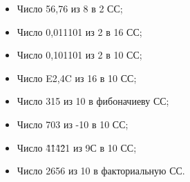 \documentclass[14pt,final,oneside]{extreport}%
\begin{document}
\begin{enumerate}
\begin{itemize}
            \item Число 56,76 из 8 в 2 СС;
            \item Число 0,011101 из 2 в 16 СС;
            \item Число 0,101101 из 2 в 10 СС;
            \item Число E2,4C из 16 в 10 СС;
            \item Число 315 из 10 в фибоначиеву СС;
            \item Число 703 из -10 в 10 СС;
            \item Число {\^4}{\^1}{\^4}{\^2}1 из 9С в 10 СС;
            \item Число 2656 из 10 в факториальную СС.
        \end{itemize}
    \end{enumerate}
\end{document}
